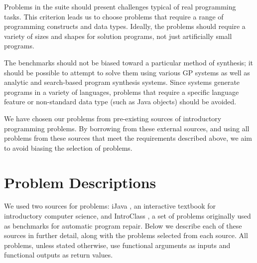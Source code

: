 \documentclass{sig-alternate}
\begin{document}
Problems in the suite should present challenges typical of real programming tasks. 
This criterion leads us to choose problems that require a range of programming constructs and data types. Ideally, the problems should require a variety of sizes and shapes for solution programs, not just artificially small programs. 

The benchmarks should not be biased toward a particular method of synthesis; it should be possible to attempt to solve them using various GP systems as well as analytic and search-based program synthesis systems. Since systems generate programs in a variety of languages, problems that require a specific language feature or non-standard data type (such as Java objects) should be avoided.

We have chosen our problems from pre-existing sources of introductory programming problems. By borrowing from these external sources, and using all problems from these sources that meet the requirements described above, we aim to avoid biasing the selection of problems.



\section{Problem Descriptions} \label{descriptionsSection}

We used two sources for problems: iJava \cite{iJava}, an interactive textbook for introductory computer science, and IntroClass \cite{ManyBugsAndIntroClass, Brun13TRgptest}, a set of problems originally used as benchmarks for automatic program repair. Below we describe each of these sources in further detail, along with the problems selected from each source. All problems, unless stated otherwise, use functional arguments as inputs and functional outputs as return values.
\end{document}
